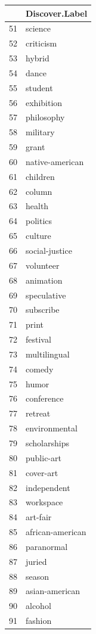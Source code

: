 \documentclass[]{report}   %
\begin{document}
\begin{figure}
\begin{minipage}[t]{0.24\textwidth}
\begin{tabular}{rl}
  \hline
 & Discover.Label \\ 
  \hline
  51 & science \\ 
  52 & criticism \\ 
  53 & hybrid \\ 
  54 & dance \\ 
  55 & student \\ 
  56 & exhibition \\ 
  57 & philosophy \\ 
  58 & military \\ 
  59 & grant \\ 
  60 & native-american \\ 
  61 & children \\ 
  62 & column \\ 
  63 & health \\ 
  64 & politics \\ 
  65 & culture \\ 
  66 & social-justice \\ 
  67 & volunteer \\ 
  68 & animation \\ 
  69 & speculative \\ 
  70 & subscribe \\ 
  71 & print \\ 
  72 & festival \\ 
  73 & multilingual \\ 
  74 & comedy \\ 
  75 & humor \\ 
  76 & conference \\ 
  77 & retreat \\ 
  78 & environmental \\ 
  79 & scholarships \\ 
  80 & public-art \\ 
  81 & cover-art \\ 
  82 & independent \\ 
  83 & workspace \\ 
  84 & art-fair \\ 
  85 & african-american \\ 
  86 & paranormal \\ 
  87 & juried \\ 
  88 & season \\ 
  89 & asian-american \\ 
  90 & alcohol \\ 
  91 & fashion \\ 

\end{tabular}
\end{minipage}
\end{figure}
\end{document}
